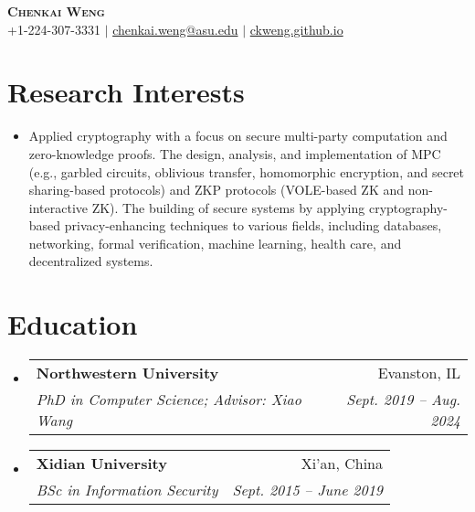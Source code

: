 \documentclass[letterpaper,11pt]{article}
\makeatletter
\newcommand{\resumeSubheading}[4]{
  \vspace{-2pt}\item
    \begin{tabular*}{0.97\textwidth}[t]{l@{\extracolsep{\fill}}r}
      \textbf{#1} & #2 \\
      \textit{\small#3} & \textit{\small #4} \\
    \end{tabular*}\vspace{-7pt}
}
\newcommand{\resumeSubHeadingListStart}{\begin{itemize}[leftmargin=0.15in, label={}]}
\newcommand{\resumeSubHeadingListEnd}{\end{itemize}}
\makeatother
\begin{document}

\begin{center}
    \textbf{\Huge \scshape Chenkai Weng} \\ \vspace{1pt}
    \small +1-224-307-3331 $|$ \href{mailto:ckweng@u.northwestern.edu}{chenkai.weng@asu.edu} $|$ 
    \href{https://ckweng.github.io}{ckweng.github.io}
\end{center}

\section{Research Interests}
  \resumeSubHeadingListStart
  \item{\small{Applied cryptography with a focus on secure multi-party computation and zero-knowledge proofs.
    The design, analysis, and implementation of MPC (e.g., garbled circuits, oblivious transfer, homomorphic encryption, and secret sharing-based protocols) and ZKP protocols (VOLE-based ZK and non-interactive ZK).
    The building of secure systems by applying cryptography-based privacy-enhancing techniques to various fields, including databases, networking, formal verification, machine learning, health care, and decentralized systems.}}
  \resumeSubHeadingListEnd

\section{Education}
  \resumeSubHeadingListStart
    \resumeSubheading
      {Northwestern University}{Evanston, IL}
      {PhD in Computer Science; Advisor: Xiao Wang}{Sept. 2019 -- Aug. 2024}
    \resumeSubheading
      {Xidian University}{Xi'an, China}
      {BSc in Information Security}{Sept. 2015 -- June 2019}
  \resumeSubHeadingListEnd
\end{document}
